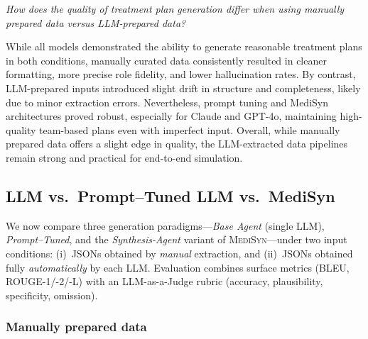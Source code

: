 \documentclass[pdflatex,sn-mathphys-num]{sn-jnl}%
\theoremstyle{thmstyleone}%
\theoremstyle{thmstyletwo}%
\theoremstyle{thmstylethree}%
\begin{document}
\textit{How does the quality of treatment plan generation differ when using manually prepared data versus LLM-prepared data?}

While all models demonstrated the ability to generate reasonable treatment plans in both conditions, manually curated data consistently resulted in cleaner formatting, more precise role fidelity, and lower hallucination rates. By contrast, LLM-prepared inputs introduced slight drift in structure and completeness, likely due to minor extraction errors. Nevertheless, prompt tuning and MediSyn architectures proved robust, especially for Claude and GPT-4o, maintaining high-quality team-based plans even with imperfect input. Overall, while manually prepared data offers a slight edge in quality, the LLM-extracted data pipelines remain strong and practical for end-to-end simulation.


    \subsection{LLM vs.\ Prompt–Tuned LLM vs.\ MediSyn}
    \label{subsec4.4}

    We now compare three generation paradigms—\emph{Base Agent} (single LLM), \emph{Prompt–Tuned}, and the \emph{Synthesis-Agent} variant of \textsc{MediSyn}—under two input conditions:
    (i)~JSONs obtained by \emph{manual} extraction, and (ii)~JSONs obtained fully \emph{automatically} by each LLM.
    Evaluation combines surface metrics (BLEU, ROUGE-1/-2/-L) with an LLM-as-a-Judge rubric (accuracy, plausibility, specificity, omission).


    \subsubsection{Manually prepared data}
    \label{subsec4.4.1}
\end{document}
